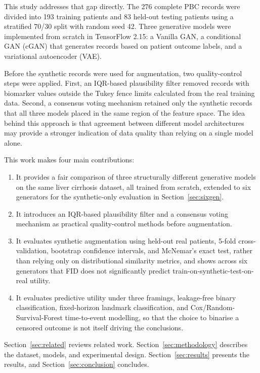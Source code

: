 \documentclass[journal]{IEEEtran}
\begin{document}
This study addresses that gap directly. The 276 complete PBC records were divided into 193 training patients and 83 held-out testing patients using a stratified 70/30 split with random seed 42. Three generative models were implemented from scratch in TensorFlow 2.15: a Vanilla GAN, a conditional GAN (cGAN) that generates records based on patient outcome labels, and a variational autoencoder (VAE).

Before the synthetic records were used for augmentation, two quality-control steps were applied. First, an IQR-based plausibility filter removed records with biomarker values outside the Tukey fence limits calculated from the real training data. Second, a consensus voting mechanism retained only the synthetic records that all three models placed in the same region of the feature space. The idea behind this approach is that agreement between different model architectures may provide a stronger indication of data quality than relying on a single model alone.

This work makes four main contributions:
\begin{enumerate}
  \item It provides a fair comparison of three structurally different generative models on the same liver cirrhosis dataset, all trained from scratch, extended to six generators for the synthetic-only evaluation in Section~\ref{sec:sixgen}.
  \item It introduces an IQR-based plausibility filter and a consensus voting mechanism as practical quality-control methods before augmentation.
  \item It evaluates synthetic augmentation using held-out real patients, 5-fold cross-validation, bootstrap confidence intervals, and McNemar's exact test, rather than relying only on distributional similarity metrics, and shows across six generators that FID does not significantly predict train-on-synthetic-test-on-real utility.
  \item It evaluates predictive utility under three framings, leakage-free binary classification, fixed-horizon landmark classification, and Cox/Random-Survival-Forest time-to-event modelling, so that the choice to binarise a censored outcome is not itself driving the conclusions.
\end{enumerate}

Section~\ref{sec:related} reviews related work. Section~\ref{sec:methodology} describes the dataset, models, and experimental design. Section~\ref{sec:results} presents the results, and Section~\ref{sec:conclusion} concludes.
\end{document}
